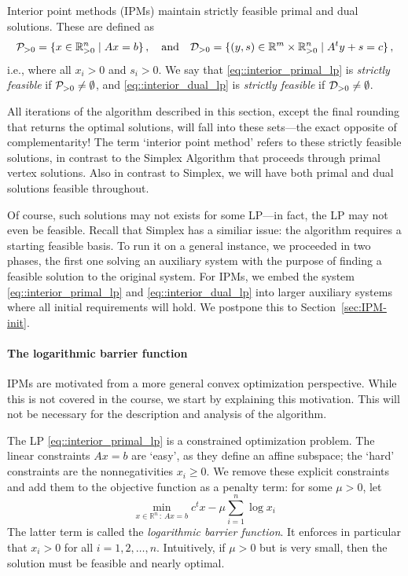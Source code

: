 \documentclass[12pt, showidx, twoside]{article}
\def\R{\mathbb{R}}
\def\Rpp{\mathbb{R}_{>0}}
\def\Primal{{\cal P}_{>0}}
\def\Dual{{\cal D}_{>0}}
\begin{document}
{{{Interior point methods (IPMs) maintain strictly feasible primal and dual solutions. These are defined as
\[
   \Primal=\{x\in\Rpp^n\mid Ax=b\}\, ,\quad\mbox{and}\quad  \Dual=\{(y,s)\in\R^m\times \Rpp^n\mid A^t y+s=c\}\, ,
\]
i.e., where all $x_i>0$ and $s_i>0$. We say that \eqref{eq::interior_primal_lp} is \emph{strictly feasible} if $\Primal\neq\emptyset$, and \eqref{eq::interior_dual_lp} is \emph{strictly feasible} if $\Dual\neq\emptyset$.

 All iterations of the algorithm described in this section, except the final rounding that returns the optimal solutions, will fall into these sets---the exact opposite of complementarity! The term `interior point method' refers to these strictly feasible solutions, in contrast to the Simplex Algorithm that proceeds through primal vertex solutions. Also in contrast to Simplex, we will have both primal and dual solutions feasible throughout.

Of course, such solutions may not exists for some LP---in fact, the LP may not even be feasible. Recall that Simplex has a similiar issue: the algorithm requires a starting feasible basis. To run it on a general instance, we proceeded in two phases, the first one solving an auxiliary system with the purpose of finding a feasible solution to the original system.
For IPMs, we embed the system \eqref{eq::interior_primal_lp} and \eqref{eq::interior_dual_lp} into larger auxiliary systems where all initial requirements will hold. We postpone this to Section~\ref{sec:IPM-init}.

\paragraph{The logarithmic barrier function}
IPMs are motivated from a more general convex optimization perspective. While this is not covered in the course, we start by explaining this motivation. This will not be necessary for the description and analysis of the algorithm.

The LP \eqref{eq::interior_primal_lp} is a constrained optimization problem. The linear constraints $Ax=b$ are `easy', as they define an affine subspace; the `hard' constraints are the nonnegativities $x_i\ge 0$. We remove these explicit constraints and add them to the objective function as a penalty term: for some $\mu>0$, let
\begin{equation}\label{eq:barrier}
\min_{x\in\R^n\,:\, Ax=b} c^t x-\mu\sum_{i=1}^n \log x_i\, 
\end{equation}
The latter term is called the \emph{logarithmic barrier function}. It enforces in particular that $x_i>0$ for all $i=1,2,\ldots,n$. Intuitively, if $\mu>0$ but is very small, then the solution must be feasible and nearly optimal.

}}}
\end{document}
